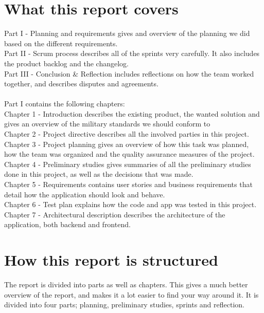 \section*{What this report covers}
Part I - Planning and requirements gives and overview of the planning we did based on the different \hspace*{4.3em} requirements. \\
Part II - Scrum process describes all of the sprints very carefully. It also includes the product
\hspace*{4.5em}backlog and the changelog. \\
Part III - Conclusion \& Reflection includes reflections on how the team worked together, and
\hspace*{4.5em}describes disputes and agreements.\\ \\
Part I contains the following chapters:\\
Chapter 1 - Introduction describes the existing product, the wanted solution and gives an overview \hspace*{5.5em} of the military standards we should conform to\\
Chapter 2 - Project directive describes all the involved parties in this project. \\ 
Chapter 3 - Project planning gives an overview of how this task was planned, how the team
\hspace*{5.5em}was organized and the quality assurance measures of the project. \\
Chapter 4 - Preliminary studies gives summaries of all the preliminary studies done in this project,
\hspace*{5.5em}as well as the decisions that was made. \\
Chapter 5 - Requirements contains user stories and business requirements that detail how the
\hspace*{5.5em}application should look and behave. \\ 
Chapter 6 - Test plan explains how the code and app was tested in this project. \\
Chapter 7 - Architectural description describes the architecture of the application, both backend
\hspace*{5.5em}and frontend. \\


\section*{How this report is structured}
The report is divided into parts as well as chapters. This gives a much better overview of the report, and makes it a lot easier to find your way around it. It is divided into four parts; planning, preliminary studies, sprints and reflection.